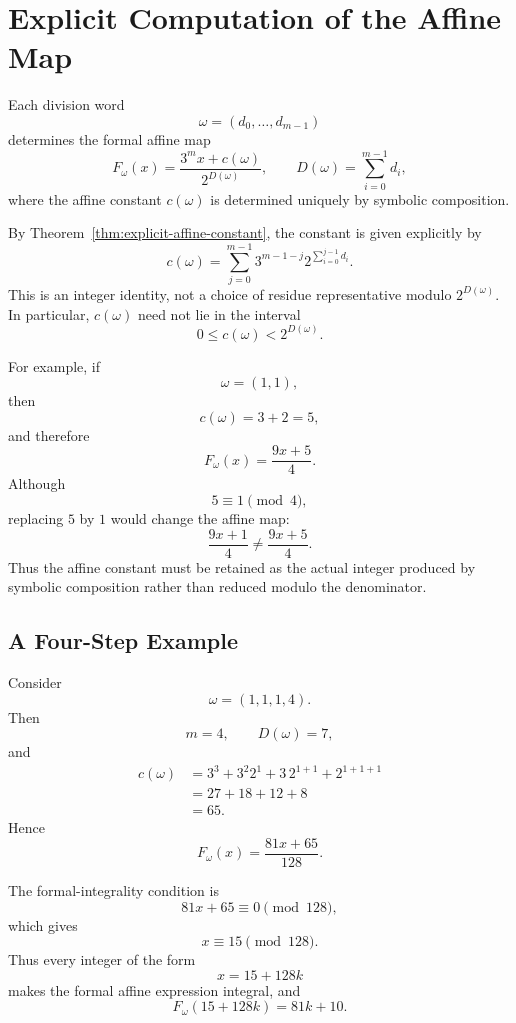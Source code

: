 \documentclass[12pt, oneside]{article}
\numberwithin{equation}{section}
\theoremstyle{definition}
\theoremstyle{plain}
\theoremstyle{remark}
\begin{document}
\appendix

\newpage
\section{Explicit Computation of the Affine Map}
\label{app:canonical-c}

Each division word
\[
\omega=(d_0,\dots,d_{m-1})
\]
determines the formal affine map
\[
F_\omega(x)
=
\frac{3^m x+c(\omega)}{2^{D(\omega)}},
\qquad
D(\omega)=\sum_{i=0}^{m-1}d_i,
\]
where the affine constant \(c(\omega)\) is determined uniquely by symbolic
composition.

By Theorem~\ref{thm:explicit-affine-constant}, the constant is given
explicitly by
\[
c(\omega)
=
\sum_{j=0}^{m-1}
3^{m-1-j}
2^{\sum_{i=0}^{j-1}d_i}.
\]
This is an integer identity, not a choice of residue representative modulo
\(2^{D(\omega)}\). In particular, \(c(\omega)\) need not lie in the interval
\[
0\le c(\omega)<2^{D(\omega)}.
\]

For example, if
\[
\omega=(1,1),
\]
then
\[
c(\omega)=3+2=5,
\]
and therefore
\[
F_\omega(x)=\frac{9x+5}{4}.
\]
Although
\[
5\equiv1\pmod4,
\]
replacing \(5\) by \(1\) would change the affine map:
\[
\frac{9x+1}{4}\ne\frac{9x+5}{4}.
\]
Thus the affine constant must be retained as the actual integer produced by
symbolic composition rather than reduced modulo the denominator.

\subsection{A Four-Step Example}

Consider
\[
\omega=(1,1,1,4).
\]
Then
\[
m=4,
\qquad
D(\omega)=7,
\]
and
\[
\begin{aligned}
c(\omega)
&=
3^3
+
3^2 2^1
+
3\,2^{1+1}
+
2^{1+1+1}
\\
&=
27+18+12+8
\\
&=
65.
\end{aligned}
\]
Hence
\[
\boxed{
F_\omega(x)=\frac{81x+65}{128}.
}
\]

The formal-integrality condition is
\[
81x+65\equiv0\pmod{128},
\]
which gives
\[
x\equiv15\pmod{128}.
\]
Thus every integer of the form
\[
x=15+128k
\]
makes the formal affine expression integral, and
\[
F_\omega(15+128k)
=
81k+10.
\]
\end{document}
